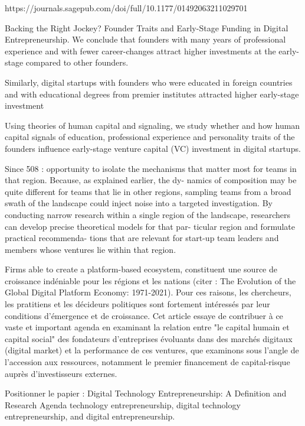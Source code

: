 \documentclass[12pt]{article}
\begin{document}
https://journals.sagepub.com/doi/full/10.1177/01492063211029701


Backing the Right Jockey? Founder Traits and Early-Stage Funding in Digital Entrepreneurship.
We conclude that founders with many years of professional experience and with fewer career-changes attract higher investments at the early-stage compared to other founders.

Similarly, digital startups with founders who were educated in foreign countries and with educational degrees from premier institutes attracted higher early-stage investment

Using theories of human capital and signaling, we study whether and how human capital signals of education, professional experience and personality traits of the founders influence early-stage venture capital (VC) investment in digital startups.

Since 508 : opportunity to isolate the mechanisms that matter most for teams in that region. Because, as explained earlier, the dy- namics of composition may be quite different for teams that lie in other regions, sampling teams from a broad swath of the landscape could inject noise into a targeted investigation. By conducting narrow research within a single region of the landscape, researchers can develop precise theoretical models for that par- ticular region and formulate practical recommenda- tions that are relevant for start-up team leaders and members whose ventures lie within that region.

Firms able to create a platform-based ecosystem, constituent une source de croissance indéniable pour les régions et les nations (citer : The Evolution of the Global Digital Platform Economy: 1971-2021). Pour ces raisons, les chercheurs, les pratitiens et les décideurs politiques sont fortement intéressés par leur conditions d'émergence et de croissance. Cet article essaye de contribuer à ce vaste et important agenda en examinant la relation entre "le capital humain et capital social" des fondateurs d'entreprises évoluants dans des marchés digitaux (digital market) et la performance de ces ventures, que examinons sous l'angle de l'accession aux ressources, notamment le premier financement de capital-risque auprès d'investisseurs externes.

Positionner le papier :
Digital Technology Entrepreneurship: A Definition and Research Agenda
technology entrepreneurship, digital technology entrepreneurship, and digital entrepreneurship.
\end{document}
